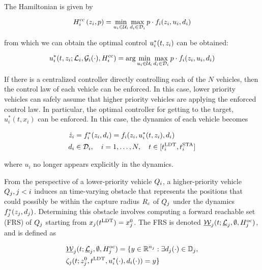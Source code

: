 The Hamiltonian is given by

\begin{equation}
H^\text{cc}_i\left(z_i, p\right) = \min_{u_i \in \mathcal{U}_i} \max_{d_i \in \mathcal{D}_i} p \cdot f_i(z_i, u_i, d_i)
\end{equation}

\noindent from which we can obtain the optimal control $u_i^*(t, z_i)$ can be obtained:

\begin{equation}
\label{eq:opt_ctrl_i}
\ctrl_i^*(t, \state_i; \targetset_i, \obsset_i(\cdot), \ccham_i) =  \arg \min_{\ctrl_i \in \cset_i} \max_{\dstb_i \in \dset_i} p \cdot \fdyn_i(\state_i, \ctrl_i, \dstb_i)
\end{equation}

If there is a centralized controller directly controlling each of the $N$ vehicles, then the control law of each vehicle can be enforced. In this case, lower priority vehicles can safely assume that higher priority vehicles are applying the enforced control law. In particular, the optimal controller for getting to the target, $u^*_i(t, x_i)$ can be enforced. In this case, the dynamics of each vehicle becomes 

\begin{equation}
\label{eq:dyn_cc}
\begin{aligned}
\dot \state_i &= \fdyn^*_i (\state_i, \dstb_i) = \fdyn_i(\state_i, \ctrl^*_i(t, \state_i), \dstb_i) \\
\dstb_i &\in \dset_i, \quad i = 1,\ldots, N, \quad t \in [\ldt_i, \sta_i]
\end{aligned}
\end{equation}

\noindent where $u_i$ no longer appears explicitly in the dynamics.

From the perspective of a lower-priority vehicle $Q_{i}$, a higher-priority vehicle $Q_{j}, j < i$ induces an time-varying obstacle that represents the positions that could possibly be within the capture radius $R_c$ of $Q_{j}$ under the dynamics $f^*_j(z_j, d_j)$. Determining this obstacle involves computing a forward reachable set (FRS) of $Q_{j}$ starting from $x_j(t^\text{LDT}) = x_j^0$. The FRS is denoted $\underline{\mathcal{W}}_j(t; \underline{\mathcal{L}}_j, \emptyset, H^\text{oc}_j)$, and is defined as 

\begin{equation}
\label{eq:FRS2_cc}
\begin{aligned}
&\underline\frs_j(t; \underline\targetset_j, \emptyset, \ocham_j) = \{y \in \R^{n_j}: \exists d_j(\cdot) \in \dfset_j, \\
&\traj_j(t; \state^0_j, \ldt, \ctrl^*_i(\cdot), \dstb_i(\cdot) )= y\}
\end{aligned}
\end{equation}

